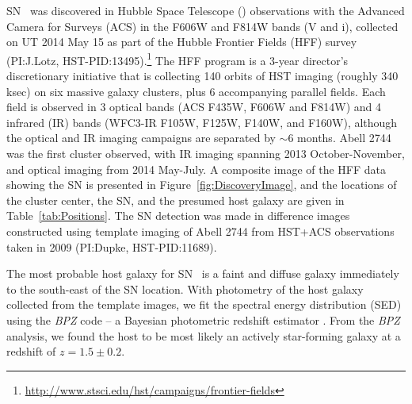 SN \tomas\ was discovered in Hubble Space Telescope (\HST) observations
with the Advanced Camera for Surveys (ACS) in the F606W and F814W
bands (V and i), collected on UT 2014 May 15 as part of the Hubble
Frontier Fields (HFF) survey (PI:J.Lotz,
HST-PID:13495).\footnote{\url{http://www.stsci.edu/hst/campaigns/frontier-fields}}
The HFF program is a 3-year director's discretionary initiative that
is collecting 140 orbits of HST imaging (roughly 340 ksec) on six
massive galaxy clusters, plus 6 accompanying parallel fields.  Each
field is observed in 3 optical bands (ACS F435W, F606W and F814W) and
4 infrared (IR) bands (WFC3-IR F105W, F125W, F140W, and F160W),
although the optical and IR imaging campaigns are separated by $\sim$6
months. Abell 2744 was the first cluster observed, with IR imaging
spanning 2013 October-November, and optical imaging from 2014
May-July.  A composite image of the HFF data showing the SN is
presented in Figure~\ref{fig:DiscoveryImage}, and the
locations of the cluster center, the SN, and the presumed host galaxy
are given in Table~\ref{tab:Positions}.  The SN detection was made in
difference images constructed using template imaging of Abell 2744
from HST+ACS observations taken in 2009 (PI:Dupke, HST-PID:11689).






The most probable host galaxy for SN \tomas\ is a faint and diffuse
galaxy immediately to the south-east of the SN location.  With
photometry of the host galaxy collected from the template images, we
fit the spectral energy distribution (SED) using the {\it BPZ} code --
a Bayesian photometric redshift estimator \citep{Benitez:2000}. 
From the {\it BPZ} analysis, we found the host to be most likely an
actively star-forming galaxy at a redshift of
$z=1.5\pm0.2$.    

